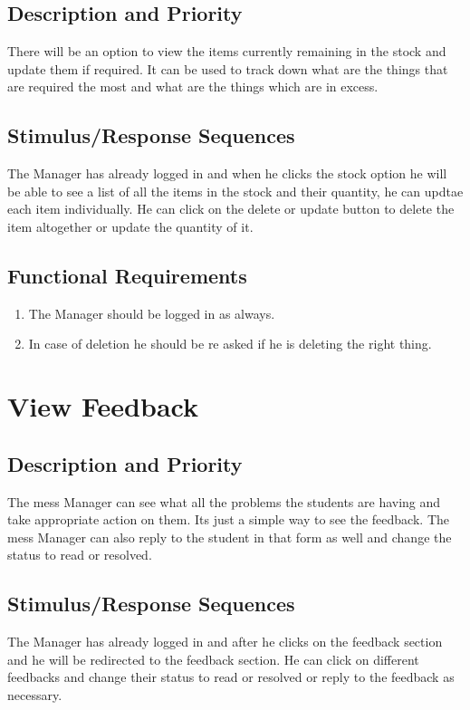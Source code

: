 \documentclass{scrreprt}
\begin{document}
\subsection{Description and Priority}
There will be an option to view the items currently remaining in the stock and update them if required. It can be used to track down what are the things that are required the most and what are the things which are in excess.

\subsection{Stimulus/Response Sequences}
The Manager has already logged in and when he clicks the stock option he will be able to see a list of all the items in the stock and their quantity, he can updtae each item individually. He can click on the delete or update button to delete the item altogether or update the quantity of it.

\subsection{Functional Requirements}
\begin{enumerate}
    \item The Manager should be logged in as always.
    \item In case of deletion he should be re asked if he is deleting the right thing.
\end{enumerate}

\section{View Feedback}

\subsection{Description and Priority}
The mess Manager can see what all the problems the students are having and take appropriate action on them. Its just a simple way to see the feedback. The mess Manager can also reply to the student in that form as well and change the status to read or resolved.

\subsection{Stimulus/Response Sequences}
The Manager has already logged in and after he clicks on the feedback section and he will be redirected to the feedback section. He can click on different feedbacks and change their status to read or resolved or reply to the feedback as necessary.
\end{document}
